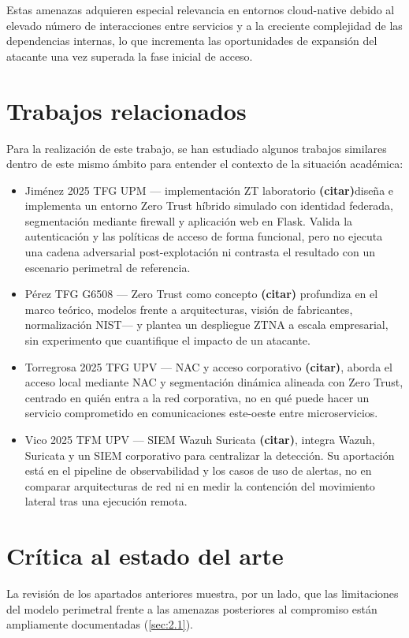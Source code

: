 \documentclass[11pt,spanish,listoffigures,listoftables]{tfgetsinf}
\begin{document}
    Estas amenazas adquieren especial relevancia en entornos cloud-native debido al elevado número de interacciones entre servicios y a la creciente complejidad de las dependencias internas, lo que incrementa las oportunidades de expansión del atacante una vez superada la fase inicial de acceso.

    \section{Trabajos relacionados}
    \label{sec:2.4}
    Para la realización de este trabajo, se han estudiado algunos trabajos similares dentro de este mismo ámbito para entender el contexto de la situación académica:
    \begin{itemize}
        \item Jiménez 2025 TFG UPM — implementación ZT laboratorio \textbf{(citar)}diseña e implementa un entorno Zero Trust híbrido simulado con identidad federada, segmentación mediante firewall y aplicación web en Flask. Valida la autenticación y las políticas de acceso de forma funcional, pero no ejecuta una cadena adversarial post-explotación ni contrasta el resultado con un escenario perimetral de referencia.
        \item Pérez TFG G6508 — Zero Trust como concepto \textbf{(citar)} profundiza en el marco teórico, modelos frente a arquitecturas, visión de fabricantes, normalización NIST— y plantea un despliegue ZTNA a escala empresarial, sin experimento que cuantifique el impacto de un atacante.
        \item Torregrosa 2025 TFG UPV — NAC y acceso corporativo \textbf{(citar)}, aborda el acceso local mediante NAC y segmentación dinámica alineada con Zero Trust, centrado en quién entra a la red corporativa, no en qué puede hacer un servicio comprometido en comunicaciones este-oeste entre microservicios. 
        \item Vico 2025 TFM UPV — SIEM Wazuh Suricata \textbf{(citar)}, integra Wazuh, Suricata y un SIEM corporativo para centralizar la detección. Su aportación está en el pipeline de observabilidad y los casos de uso de alertas, no en comparar arquitecturas de red ni en medir la contención del movimiento lateral tras una ejecución remota.
    \end{itemize}
    
    \section{Crítica al estado del arte}
    La revisión de los apartados anteriores muestra, por un lado, que las limitaciones del modelo perimetral frente a las amenazas posteriores al compromiso están ampliamente documentadas (\cref{sec:2.1}). 
    
\end{document}
